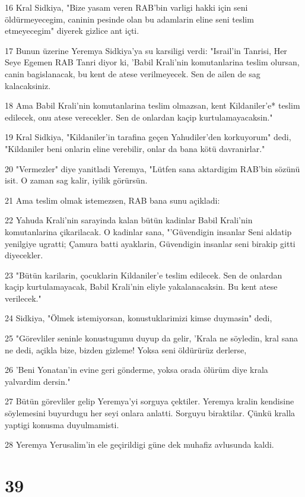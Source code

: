 \par 16 Kral Sidkiya, "Bize yasam veren RAB'bin varligi hakki için seni öldürmeyecegim, caninin pesinde olan bu adamlarin eline seni teslim etmeyecegim" diyerek gizlice ant içti.
\par 17 Bunun üzerine Yeremya Sidkiya'ya su karsiligi verdi: "Israil'in Tanrisi, Her Seye Egemen RAB Tanri diyor ki, 'Babil Krali'nin komutanlarina teslim olursan, canin bagislanacak, bu kent de atese verilmeyecek. Sen de ailen de sag kalacaksiniz.
\par 18 Ama Babil Krali'nin komutanlarina teslim olmazsan, kent Kildaniler'e* teslim edilecek, onu atese verecekler. Sen de onlardan kaçip kurtulamayacaksin."
\par 19 Kral Sidkiya, "Kildaniler'in tarafina geçen Yahudiler'den korkuyorum" dedi, "Kildaniler beni onlarin eline verebilir, onlar da bana kötü davranirlar."
\par 20 "Vermezler" diye yanitladi Yeremya, "Lütfen sana aktardigim RAB'bin sözünü isit. O zaman sag kalir, iyilik görürsün.
\par 21 Ama teslim olmak istemezsen, RAB bana sunu açikladi:
\par 22 Yahuda Krali'nin sarayinda kalan bütün kadinlar Babil Krali'nin komutanlarina çikarilacak. O kadinlar sana, "'Güvendigin insanlar Seni aldatip yenilgiye ugratti; Çamura batti ayaklarin, Güvendigin insanlar seni birakip gitti diyecekler.
\par 23 "Bütün karilarin, çocuklarin Kildaniler'e teslim edilecek. Sen de onlardan kaçip kurtulamayacak, Babil Krali'nin eliyle yakalanacaksin. Bu kent atese verilecek."
\par 24 Sidkiya, "Ölmek istemiyorsan, konustuklarimizi kimse duymasin" dedi,
\par 25 "Görevliler seninle konustugumu duyup da gelir, 'Krala ne söyledin, kral sana ne dedi, açikla bize, bizden gizleme! Yoksa seni öldürürüz derlerse,
\par 26 'Beni Yonatan'in evine geri gönderme, yoksa orada ölürüm diye krala yalvardim dersin."
\par 27 Bütün görevliler gelip Yeremya'yi sorguya çektiler. Yeremya kralin kendisine söylemesini buyurdugu her seyi onlara anlatti. Sorguyu biraktilar. Çünkü kralla yaptigi konusma duyulmamisti.
\par 28 Yeremya Yerusalim'in ele geçirildigi güne dek muhafiz avlusunda kaldi.

\chapter{39}

